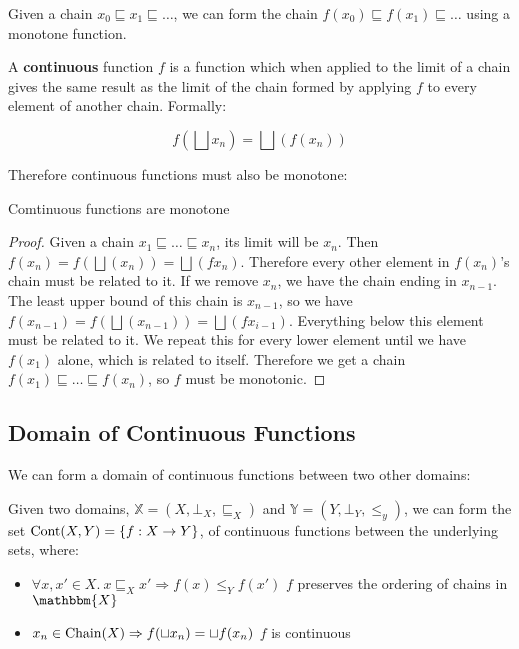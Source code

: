 Given a chain $x_0 \sqsubseteq x_1 \sqsubseteq \dots$, we can form the chain $f(x_0) \sqsubseteq f(x_1) \sqsubseteq \dots$ using a monotone function.

\vspace{0.25cm}

\begin{defn}
A \textbf{continuous} function $f$ is a function which when applied to the limit of a chain gives the same result as the limit of the chain formed by applying $f$ to every element of another chain. Formally:

\[ f(\bigsqcup x_n) = \bigsqcup (f(x_n))\]
\end{defn}

Therefore continuous functions must also be monotone:

\vspace{0.25cm}

\begin{thm}
Comtinuous functions are monotone
\end{thm}

\begin{proof}
Given a chain $x_1 \sqsubseteq  \dots \sqsubseteq x_n$, its limit will be $x_n$. Then $f(x_n) = f(\bigsqcup (x_n)) =  \bigsqcup(f x_n)$. Therefore every other element in $f(x_n)$'s chain must be related to it. If we remove $x_n$, we have the chain ending in $x_{n - 1}$. The least upper bound of this chain is $x_{n - 1}$, so we have  $f(x_{n-1}) =  f(\bigsqcup (x_{n-1})) = \bigsqcup(f x_{i-1})$.  Everything below this element must be related to it. We repeat this for every lower element until we have $f(x_1)$ alone, which is related to itself. Therefore we get a chain $f(x_1)  \sqsubseteq  \dots \sqsubseteq f(x_n)$, so $f$ must be monotonic. 
\end{proof}

\subsection{Domain of Continuous Functions}\label{cont}

We can form a domain of continuous functions between two other domains:

Given two domains, $\mathbb{X} = (X, \bot_X, \sqsubseteq_X)$ and $\mathbb{Y} = (Y, \bot_Y, \leq_y)$, we can form the set $\operatorname{Cont}(X,Y) =\{ f : X \to Y\}$, of continuous functions between the underlying sets, where:

\begin{itemize}
\item{$\forall x, x' \in X. \ x \sqsubseteq_X x' \Rightarrow f(x) \leq_Y f(x')$ \hspace{1cm} $f$ preserves the ordering of chains in $\mathbbm{X}$}
\item{$x_n \in \operatorname{Chain}(X) \Rightarrow f(\sqcup x_n) = \sqcup f(x_n)$ \hspace{2cm} $f$ is continuous}
\end{itemize} 

